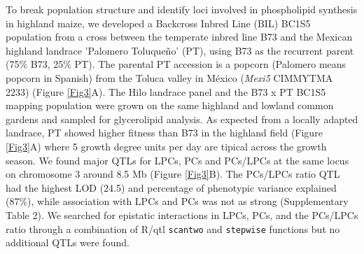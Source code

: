 \documentclass[9pt,twocolumn,twoside,lineno]{BioRxiv}
\def\code#1{\texttt{#1}}
\begin{document}
To break population structure and identify loci involved in phospholipid synthesis in highland maize, we developed a Backcross Inbred Line (BIL) BC1S5 population from a cross between the temperate inbred line B73 and the Mexican highland landrace 'Palomero Toluqueño' (PT), using B73 as the recurrent parent (75\% B73, 25\% PT). 
The parental PT accession is a popcorn (Palomero means popcorn in Spanish) from the Toluca valley in México (\textit{Mexi5} CIMMYTMA 2233) (Figure \ref{Fig3}A). 
The Hilo landrace panel and the B73 x PT BC1S5 mapping population were grown on the same highland and lowland common gardens and sampled for glycerolipid analysis.
As expected from a locally adapted landrace, PT showed higher fitness than B73  in the highland field (Figure \ref{Fig3}A) where 5 growth degree units per day are tipical across the growth season.
We found major QTLs for LPCs, PCs and PCs/LPCs at the same locus on chromosome 3 around 8.5 Mb (Figure \ref{Fig3}B). 
The PCs/LPCs ratio QTL had the highest LOD (24.5) and percentage of phenotypic variance explained (87\%), while association with LPCs and PCs was not as strong (Supplementary Table 2).
We searched for epistatic interactions in LPCs, PCs, and the PCs/LPCs ratio through a combination of R/qtl \code{scantwo} and \code{stepwise} functions \cite{Broman2003-ac} but no additional QTLs were found.
\end{document}
